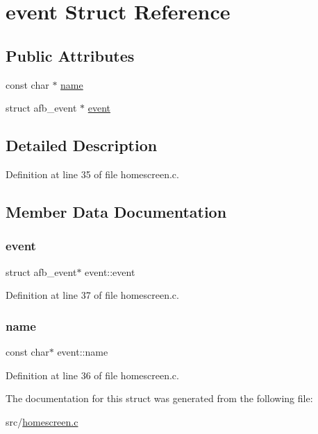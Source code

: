 \hypertarget{structevent}{}\section{event Struct Reference}
\label{structevent}
\subsection*{Public Attributes}
\begin{DoxyCompactItemize}
\item 
const char $\ast$ \hyperlink{structevent_a45c6cfb7961a21a3366db067e4cc59ab}{name}
\item 
struct afb\+\_\+event $\ast$ \hyperlink{structevent_a58726ebc551d36562ac3f9e1fe293214}{event}
\end{DoxyCompactItemize}


\subsection{Detailed Description}


Definition at line 35 of file homescreen.\+c.



\subsection{Member Data Documentation}
\mbox{\label{structevent_a58726ebc551d36562ac3f9e1fe293214}} 
\subsubsection{\texorpdfstring{event}{event}}
{\footnotesize\ttfamily struct afb\+\_\+event$\ast$ event\+::event}



Definition at line 37 of file homescreen.\+c.

\mbox{\label{structevent_a45c6cfb7961a21a3366db067e4cc59ab}} 
\subsubsection{\texorpdfstring{name}{name}}
{\footnotesize\ttfamily const char$\ast$ event\+::name}



Definition at line 36 of file homescreen.\+c.



The documentation for this struct was generated from the following file\+:\begin{DoxyCompactItemize}
\item 
src/\hyperlink{homescreen_8c}{homescreen.\+c}\end{DoxyCompactItemize}
